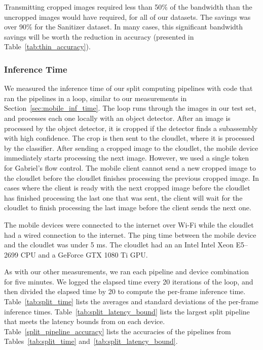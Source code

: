 Transmitting cropped images required less than 50\% of the bandwidth than
the uncropped images would have required, for all of our datasets.
The savings was over 90\% for the Sanitizer dataset.
In many cases, this significant bandwidth savings will be worth the reduction in
accuracy (presented in Table~\ref{tab:thin_accuracy}).

\subsubsection{Inference Time}

We measured the inference time of our split computing pipelines with code that
ran the pipelines in a loop, similar to our measurements in
Section~\ref{sec:mobile_inf_time}.
The loop runs through the images in our test set, and processes each one locally
with an object detector.
After an image is processed by the object detector, it is cropped if the
detector finds a subassembly with high confidence.
The crop is then sent to the cloudlet, where it is processed by the classifier.
After sending a cropped image to the cloudlet, the mobile device immediately
starts processing the next image.
However, we used a single token for Gabriel's flow control.
The mobile client cannot send a new cropped image to the cloudlet before the
cloudlet finishes processing the previous cropped image.
In cases where the client is ready with the next cropped image before the
cloudlet has finished processing the last one that was sent, the client will
wait for the cloudlet to finish processing the last image before the client
sends the next one.

The mobile devices were connected to the internet over Wi-Fi while the cloudlet
had a wired connection to the internet.
The ping time between the mobile device and the cloudlet was under 5 ms.
The cloudlet had an an Intel Intel Xeon E5–2699 CPU and a GeForce GTX 1080 Ti
GPU.

As with our other measurements, we ran each pipeline and device combination for
five minutes.
We logged the elapsed time every 20 iterations of the loop, and then divided the
elapsed time by 20 to compute the per-frame inference time.
Table~\ref{tab:split_time} lists the averages and standard deviations of the
per-frame inference times.
Table~\ref{tab:split_latency_bound} lists the largest
split pipeline that meets the latency bounds from \citet{chen2017} on each
device.
Table~\ref{split_pipeline_accuracy} lists the accuracies of the pipelines from
Tables~\ref{tab:split_time} and~\ref{tab:split_latency_bound}.

